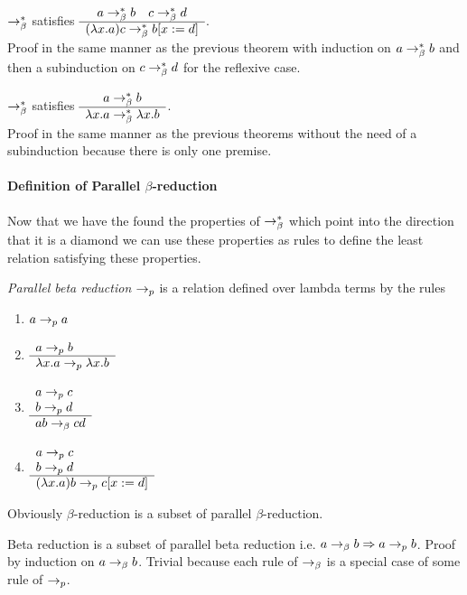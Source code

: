 \begin{theorem}
  $\to^*_\beta$ satisfies
  $\begin{array}{c} 
    a\to^*_\beta b \quad
    c \to^*_\beta d \\ \hline (\lambda x.a)c \to^*_\beta b[x:=d]\end{array}$.
  \\ Proof in the same manner as the previous theorem with induction on
  $a\to^*_\beta b$ and then a subinduction on $c \to^*_\beta d$ for the
  reflexive case.
\end{theorem}


\begin{theorem}
  $\to^*_\beta$ satisfies
  $\begin{array}{c} 
    a\to^*_\beta b \\ \hline \lambda x.a \to^*_\beta \lambda x.b\end{array}$.\\
Proof in the same manner as the previous theorems without the need of a
subinduction because there is only one premise.
\end{theorem}


\paragraph{Definition of Parallel $\beta$-reduction}

Now that we have the found the properties of $\to^*_\beta$ which point into
the direction that it is a diamond we can use these properties as rules to
define the least relation satisfying these properties.


\begin{definition}
\label{def:parallelbeta}
  \emph{Parallel beta reduction} $\to_{p}$ is a relation
  defined over lambda terms by the rules
  \begin{enumerate}
  \item $a \to_{p} a$
  \item $\begin{array}{l} a \to_{p} b \\ \hline \lambda x.a \to_{p} \lambda x.b\end{array}$
  \item $\begin{array}{l} a\to_{p} c \\ b \to_{p} d \\ \hline a b \to_\beta c d\end{array}$
  \item $\begin{array}{l} a\to_{p} c \\ b \to_{p} d \\ \hline (\lambda x.a) b \to_{p} c[x := d]\end{array}$
  \end{enumerate}
\end{definition}

Obviously $\beta$-reduction is a subset of parallel
$\beta$-reduction.
\begin{lemma}
  Beta reduction is a subset of parallel beta reduction i.e.
  $a \to_\beta b \Rightarrow a \to_{p} b$.
  Proof by induction on $a \to_\beta b$. Trivial because each rule of $\to_\beta$
  is a special case of some rule of $\to_{p}$.
\end{lemma}



